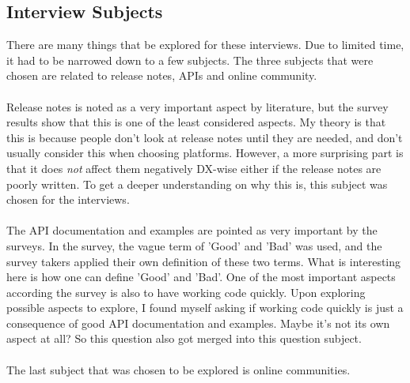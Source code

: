 \documentclass{cslthse-msc}
\begin{document}
    \subsection{Interview Subjects}
    There are many things that be explored for these interviews. Due to limited
    time, it had to be narrowed down to a few subjects. The three subjects
    that were chosen are related to release notes, APIs and online community.
    \\ \\
    Release notes is noted as a very important aspect by literature, but
    the survey results show that this is one of the least considered aspects.
    My theory is that this is because people don't look
    at release notes until they are needed, and don't usually consider this
    when choosing platforms. However, a more surprising part is that it does \textit{not}
    affect them negatively DX-wise either if the release notes are poorly written.
    To get a deeper understanding on why this is, this subject was chosen for the interviews.
    \\ \\
    The API documentation and examples are pointed as very important by the
    surveys. In the survey, the vague term of 'Good' and 'Bad' was used, and
    the survey takers applied their own definition of these two terms. What is interesting here is how one can define 'Good' and 'Bad'. One of the most important
    aspects according the survey is also to have working code quickly. Upon exploring
    possible aspects to explore, I found myself asking if working code quickly
    is just a consequence of good API documentation and examples. Maybe it's not
    its own aspect at all? So this question also got merged into this question subject.
    \\ \\
    The last subject that was chosen to be explored is online communities.
\end{document}
